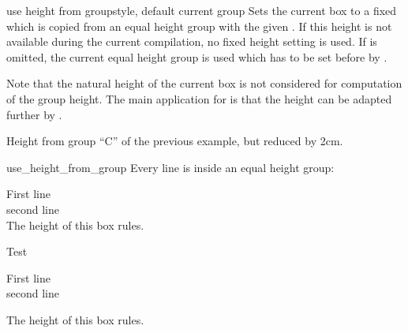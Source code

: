 \clearpage
\begin{docTcbKey}[][doc new and updated={2015-11-27}{2016-02-22}]{use height from group}{}{style, default current group}
  Sets the current box to a fixed  which is copied from
  an equal height group with the given . If this height is not
  available during the current compilation, no fixed height setting is used.
  If  is omitted, the current equal height group is used which has
  to be set before by .\par
  Note that the natural height of the current box is not considered for
  computation of the group height. The main application for
   is that the height can be adapted
  further by .

\begin{dispExample}
\begin{tcolorbox}[use height from group=C,add to height=-2cm,
  colframe=blue!75!black,colback=white]
Height from group ``C'' of the previous example, but reduced by 2cm.
\end{tcolorbox}%
\end{dispExample}

\begin{exdispExample}[runs=2]{use_height_from_group}
Every line is inside an equal height group:
\begin{tcbraster}[raster equal height=rows,
    title=Box \thetcbrasternum,
    enhanced,size=small,colframe=red!50!black,colback=red!10!white]
  \begin{tcolorbox}First line\\second line\\
    The height of this box rules.\end{tcolorbox}
  \begin{tcolorbox}Test\end{tcolorbox}
  \begin{tcolorbox}
    First line\\second line\end{tcolorbox}
  \begin{tcolorbox}The height of this box rules.\end{tcolorbox}
\end{tcbraster}
\end{exdispExample}
\end{docTcbKey}



